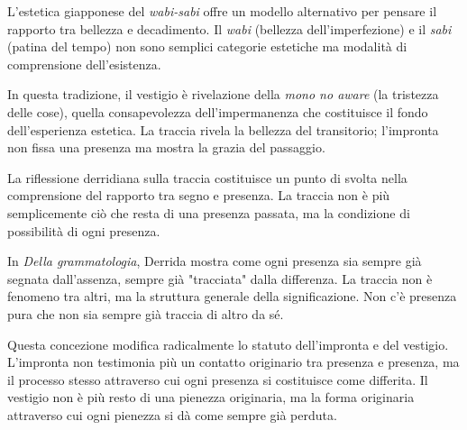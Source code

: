 \documentclass{../../lib/gs}
\begin{document}

L'estetica giapponese del \textit{wabi-sabi} \cite{kuki1930} offre un modello alternativo per pensare il rapporto tra bellezza e decadimento. Il \textit{wabi} (bellezza dell'imperfezione) e il \textit{sabi} (patina del tempo) non sono semplici categorie estetiche ma modalità di comprensione dell'esistenza.

In questa tradizione, il vestigio è rivelazione della \textit{mono no aware} (la tristezza delle cose), quella consapevolezza dell'impermanenza che costituisce il fondo dell'esperienza estetica. La traccia rivela la bellezza del transitorio; l'impronta non fissa una presenza ma mostra la grazia del passaggio.

%

La riflessione derridiana sulla traccia \cite{derrida1967} costituisce un punto di svolta nella comprensione del rapporto tra segno e presenza. La traccia non è più semplicemente ciò che resta di una presenza passata, ma la condizione di possibilità di ogni presenza.

In \textit{Della grammatologia}, Derrida mostra come ogni presenza sia sempre già segnata dall'assenza, sempre già "tracciata" dalla differenza. La traccia non è fenomeno tra altri, ma la struttura generale della significazione. Non c'è presenza pura che non sia sempre già traccia di altro da sé.

Questa concezione modifica radicalmente lo statuto dell'impronta e del vestigio. L'impronta non testimonia più un contatto originario tra presenza e presenza, ma il processo stesso attraverso cui ogni presenza si costituisce come differita. Il vestigio non è più resto di una pienezza originaria, ma la forma originaria attraverso cui ogni pienezza si dà come sempre già perduta.

\end{document}
